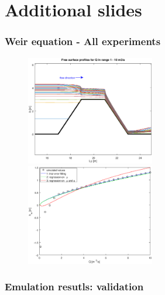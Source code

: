 \documentclass[xcolor=dvipsnames, USenglish]{beamer}  %
\begin{document}
\section{Additional slides}
  \begin{frame}
    \frametitle{Weir equation - All experiments}
      \begin{figure}[t]
        \includegraphics[width=0.5\textwidth]{img/free_surfaces_all.eps}
        \includegraphics[width=0.5\textwidth]{img/points_interpolations_all.eps}
      \end{figure}
  \end{frame}

  \begin{frame}
    \frametitle{Emulation resutls: validation}
    \begin{table}
    \centering
    \end{table}
  \end{frame}
\end{document}
